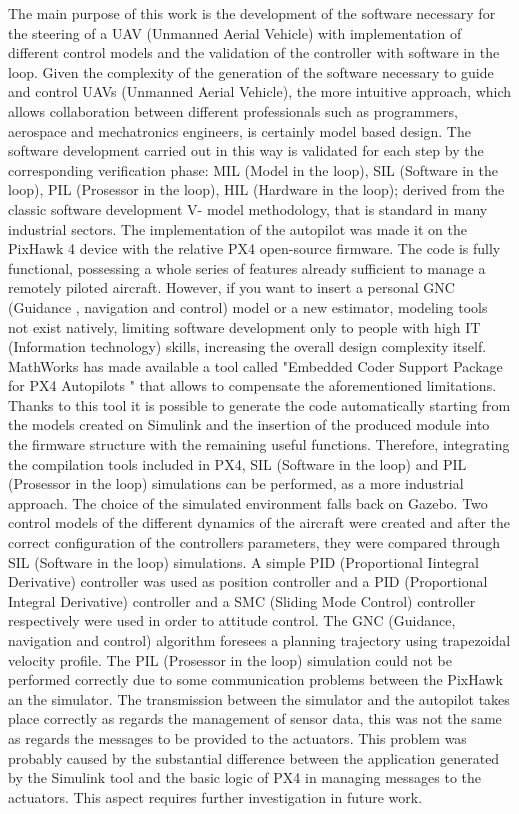 \begin{commento}
The main purpose of this work is the development of the software necessary for the steering of a UAV (Unmanned Aerial Vehicle) with implementation of different control models and  the validation of the controller with software in the loop.
Given the complexity of the generation of the software necessary to guide and control UAVs (Unmanned Aerial Vehicle), the more intuitive approach, which allows collaboration between different professionals such as programmers, aerospace and mechatronics engineers, is certainly model based design.
The software development carried out in this way is validated for each step by the corresponding verification phase: MIL (Model in the loop), SIL (Software in the loop), PIL (Prosessor in the loop), HIL (Hardware in the loop); derived from the classic software development V- model methodology, that is standard in many industrial sectors.
The implementation of the autopilot was made it on the PixHawk 4 device with the relative PX4 open-source firmware. The code is fully functional, possessing a whole series of features already sufficient to manage a remotely piloted aircraft. However, if you want to insert a personal GNC (Guidance , navigation and control) model or a new estimator, modeling tools not exist natively, limiting software development only to people with high IT (Information technology) skills, increasing the  overall design complexity itself.
MathWorks has made available a tool called "Embedded Coder Support Package
for PX4 Autopilots " that allows to compensate the aforementioned limitations. Thanks to this tool it is possible to generate the code automatically starting from the models created on Simulink and the insertion of the produced module into the firmware structure with the remaining useful functions. Therefore, integrating the compilation tools included in PX4, SIL (Software in the loop) and PIL (Prosessor in the loop) simulations can be performed, as a more industrial approach.
The choice of the simulated environment falls back on Gazebo.
Two control models of the different dynamics of the aircraft were created and after the correct configuration of the controllers parameters, they were compared through SIL (Software in the loop) simulations. A simple PID (Proportional Iintegral Derivative) controller was used as position controller and a PID (Proportional Integral Derivative) controller and a SMC (Sliding Mode Control) controller respectively were used in order to attitude control. The GNC (Guidance, navigation and control) algorithm foresees a planning trajectory using trapezoidal velocity profile.
The PIL (Prosessor in the loop) simulation could not be performed correctly due to some communication problems between the PixHawk an the simulator. The transmission between the simulator and the autopilot takes place correctly as regards the management of sensor data, this was not the same as regards the messages to be provided to the actuators. This problem was probably caused by the substantial difference between the application generated by the Simulink tool and the basic logic of PX4 in managing messages to the actuators. This aspect requires further investigation in future work.

\end{commento}